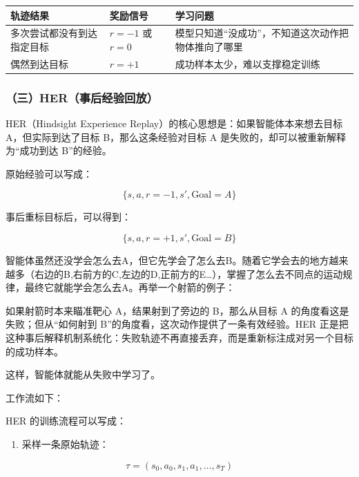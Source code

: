 \begin{longtable}[]{@{}
  >{\raggedright\arraybackslash}p{}
  >{\raggedright\arraybackslash}p{}
  >{\raggedright\arraybackslash}p{}@{}}
\toprule
轨迹结果 & 奖励信号 & 学习问题 \\
\midrule
\endhead
多次尝试都没有到达指定目标 & \(r=-1\) 或 \(r=0\) & 模型只知道``没成功''，不知道这次动作把物体推向了哪里 \\
偶然到达目标 & \(r=+1\) & 成功样本太少，难以支撑稳定训练 \\
\bottomrule
\end{longtable}

\hypertarget{ux4e09herux4e8bux540eux7ecfux9a8cux56deux653e}{%
\subsubsection{（三）HER（事后经验回放）}\label{ux4e09herux4e8bux540eux7ecfux9a8cux56deux653e}}

HER（Hindsight Experience Replay）的核心思想是：如果智能体本来想去目标 A，但实际到达了目标 B，那么这条经验对目标 A 是失败的，却可以被重新解释为``成功到达 B''的经验。

原始经验可以写成：

\[
\{s,a,r=-1,s',\mathrm{Goal}=A\}
\]

事后重标目标后，可以得到：

\[
\{s,a,r=+1,s',\mathrm{Goal}=B\}
\]

智能体虽然还没学会怎么去A，但它先学会了怎么去B。随着它学会去的地方越来越多（右边的B,右前方的C,左边的D,正前方的E\ldots），掌握了怎么去不同点的运动规律，最终它就能学会怎么去A。再举一个射箭的例子：

如果射箭时本来瞄准靶心 A，结果射到了旁边的 B，那么从目标 A 的角度看这是失败；但从``如何射到 B''的角度看，这次动作提供了一条有效经验。HER 正是把这种事后解释机制系统化：失败轨迹不再直接丢弃，而是重新标注成对另一个目标的成功样本。

这样，智能体就能从失败中学习了。

工作流如下：

HER 的训练流程可以写成：

\begin{enumerate}
\def\labelenumi{\arabic{enumi}.}
\tightlist
\item
  采样一条原始轨迹：
\end{enumerate}

\[
\tau=(s_0,a_0,s_1,a_1,\ldots,s_T)
\]

